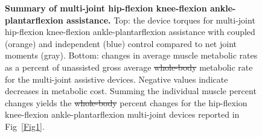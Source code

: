 \documentclass[10pt,letterpaper]{article}
\providecommand{\DIFaddtex}[1]{{\protect\color{blue}{#1}}} %
\providecommand{\DIFdeltex}[1]{{\protect\color{red}\sout{#1}}}                      %
\providecommand{\DIFaddFL}[1]{\DIFadd{#1}} %
\providecommand{\DIFdelFL}[1]{\DIFdel{#1}} %
\providecommand{\DIFaddbeginFL}{} %
\providecommand{\DIFaddendFL}{} %
\providecommand{\DIFdelbeginFL}{} %
\providecommand{\DIFdelendFL}{} %
\providecommand{\DIFadd}[1]{\texorpdfstring{\DIFaddtex{#1}}{#1}} %
\providecommand{\DIFdel}[1]{\texorpdfstring{\DIFdeltex{#1}}{}} %
\newcommand{\DIFscaledelfig}{0.5}
\newlength{\DIFdelgraphicswidth} %
\newlength{\DIFdelgraphicsheight} %
\newcommand{\DIFaddincludegraphics}[2][]{{\color{blue}\fbox{\DIFOincludegraphics[#1]{#2}}}} %
\newcommand{\DIFdelincludegraphics}[2][]{%
\sbox{\DIFdelgraphicsbox}{\DIFOincludegraphics[#1]{#2}}%
\settoboxwidth{\DIFdelgraphicswidth}{\DIFdelgraphicsbox} %
\settoboxtotalheight{\DIFdelgraphicsheight}{\DIFdelgraphicsbox} %
\scalebox{\DIFscaledelfig}{%
\parbox[b]{\DIFdelgraphicswidth}{\usebox{\DIFdelgraphicsbox}\\[-\baselineskip] \rule{\DIFdelgraphicswidth}{0em}}\llap{\resizebox{\DIFdelgraphicswidth}{\DIFdelgraphicsheight}{%
\setlength{\unitlength}{\DIFdelgraphicswidth}%
\begin{picture}(1,1)%
\thicklines\linethickness{2pt} %
{\color[rgb]{1,0,0}\put(0,0){\framebox(1,1){}}}%
{\color[rgb]{1,0,0}\put(0,0){\line( 1,1){1}}}%
{\color[rgb]{1,0,0}\put(0,1){\line(1,-1){1}}}%
\end{picture}%
}*{3pt}}} %
} %
\DeclareRobustCommand{\DIFaddbeginFL}{\DIFOaddbeginFL \let\includegraphics\DIFaddincludegraphics} %
\DeclareRobustCommand{\DIFaddendFL}{\DIFOaddendFL \let\includegraphics\DIFOincludegraphics} %
\DeclareRobustCommand{\DIFdelbeginFL}{\DIFOdelbeginFL \let\includegraphics\DIFdelincludegraphics} %
\DeclareRobustCommand{\DIFdelendFL}{\DIFOaddendFL \let\includegraphics\DIFOincludegraphics} %
\begin{document}
\begin{figure}[!h]
\begin{adjustwidth}{-1in}{0in} %
    \centering
    \caption{{\bf Summary of multi-joint hip-flexion knee-flexion ankle-plantarflexion assistance.}
        Top: the device torques for multi-joint hip-flexion knee-flexion ankle-plantarflexion assistance with coupled (orange) and independent (blue) control compared to net joint moments (gray). Bottom: changes in average muscle metabolic rates as a percent of unassisted gross average \DIFdelbeginFL \DIFdelFL{whole-body }\DIFdelendFL \DIFaddbeginFL \DIFaddFL{total }\DIFaddendFL metabolic rate for the multi-joint assistive devices. Negative values indicate decreases in metabolic cost. \DIFaddbeginFL \DIFaddFL{Solid bars and error bars indicate the mean and standard deviation across subjects, respectively. }\DIFaddendFL Summing the individual muscle percent changes yields the \DIFdelbeginFL \DIFdelFL{whole-body }\DIFdelendFL \DIFaddbeginFL \DIFaddFL{total }\DIFaddendFL percent changes for the hip-flexion knee-flexion ankle-plantarflexion multi-joint devices reported in Fig~\ref{Fig1}.}
\label{Fig6}
\end{adjustwidth}
\end{figure}
\end{document}
